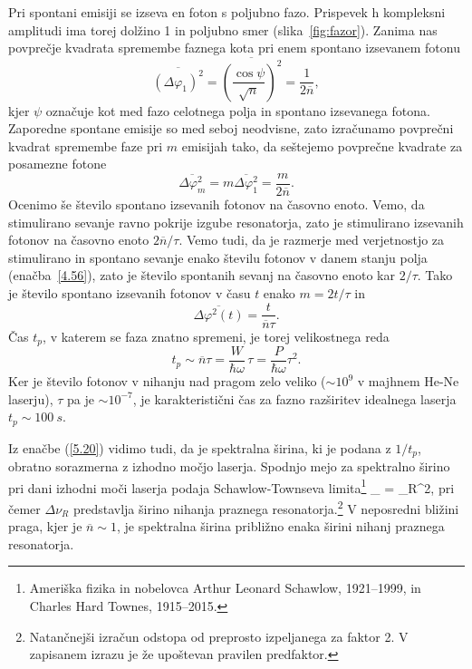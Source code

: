 Pri spontani emisiji se izseva en foton s poljubno fazo. Prispevek h kompleksni
amplitudi ima torej dolžino 1 in poljubno smer (slika~\ref{fig:fazor}). Zanima
nas povprečje kvadrata spremembe faznega kota pri enem spontano izsevanem fotonu
\begin{equation}
\overline{(\Delta \varphi_{1})^{2}}=\overline{\left(\frac{\cos\psi}{\sqrt{n} }\right)^2}
=\frac{1}{2\overline{n}},
\label{5.17}
\end{equation}
kjer $\psi$ označuje kot med fazo celotnega polja in spontano izsevanega fotona. 
Zaporedne spontane emisije so med seboj neodvisne, zato izračunamo
povprečni kvadrat spremembe faze pri $m$ emisijah tako, da seštejemo
povprečne kvadrate za posamezne fotone 
\begin{equation}
\overline{\Delta \varphi_{m}^{2}}=m\overline{\Delta \varphi_{1}^{2}}=
\frac{m}{2\overline{n}}.
\label{5.18}
\end{equation}
Ocenimo še število spontano izsevanih fotonov na časovno enoto.
Vemo, da stimulirano sevanje ravno pokrije izgube resonatorja, zato je
stimulirano izsevanih fotonov na časovno enoto $2\overline{n}/\tau $. Vemo tudi, 
da je razmerje med verjetnostjo za stimulirano in spontano sevanje enako 
številu fotonov v danem stanju polja (enačba~\ref{4.56}), zato je število 
spontanih sevanj na časovno enoto kar $2/\tau $.
Tako je število spontano izsevanih fotonov v času $t$ enako $m=2t/\tau $ in 
\begin{equation}
\overline{\Delta \varphi^{2}(t)}=\frac{t}{\overline{n}\tau }.
\label{5.19}
\end{equation}
Čas $t_{p}$, v katerem se faza znatno spremeni, je torej
velikostnega reda 
\begin{equation}
t_{p}\sim \overline{n}\tau =\frac{W}{\hbar \omega }\,\tau =\frac{P}{\hbar
\omega }\tau ^{2}.
\label{5.20}
\end{equation}
Ker je število fotonov v nihanju nad pragom zelo veliko ($\sim 10^9$ v majhnem 
He-Ne laserju), $\tau$ pa je $\sim 10^{-7}$, je karakteristični
čas za fazno razširitev idealnega laserja $t_p \sim 100~\si{s}$. 

Iz enačbe (\ref{5.20}) vidimo tudi, da je spektralna širina, ki je
podana z $1/t_{p}$, obratno sorazmerna z izhodno močjo laserja. Spodnjo
mejo za spektralno širino pri dani izhodni moči laserja 
podaja Schawlow-Townseva limita\footnote{Ameriška fizika in nobelovca 
Arthur Leonard Schawlow, 1921--1999, in Charles Hard Townes, 1915--2015.}
\beq
\Delta \nu_ =  \Delta \nu_R^2,
\eeq
pri čemer $\Delta \nu_R$ predstavlja širino nihanja praznega 
resonatorja.\footnote{Natančnejši izračun odstopa od preprosto izpeljanega za faktor 2. V 
zapisanem izrazu je že upoštevan pravilen predfaktor.}
V neposredni bližini praga, kjer je $\overline{n}\sim 1$, je 
spektralna širina približno enaka širini nihanj praznega resonatorja.


